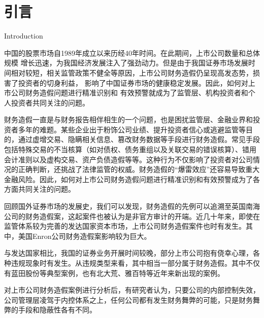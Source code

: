 \chapter{引言}{Introduction}



中国的股票市场自1989年成立以来历经40年时间。在此期间，上市公司数量和总体规模 增长迅速，为我国经济发展注入了强劲动力。但是由于我国证券市场发展时间相对较短，相关监管政策不健全等原因，上市公司财务造假仍呈现高发态势，损害了投资者的切身利益， 影响了中国证券市场的健康稳定发展。因此，如何对上市公司财务造假问题进行精准识别和 有效预警就成为了监管层、机构投资者和个人投资者共同关注的问题。


财务造假一直是与财务报告相伴相生的一个问题，也是困扰监管层、金融业界和投资者多年的难题。某些企业出于粉饰公司业绩、提升投资者信心或逃避监管等目的，通过虚增交易、隐瞒相关信息、篡改财务数据等手段进行财务造假。常见手段包括特殊交易的不当核算（如对债权、债务重组以及关联交易的错误核算）、错用会计准则以及虚构交易、资产负债造假等等。这种行为不仅影响了投资者对公司情况的正确判断，还挑战了法律监管的权威。财务造假的“爆雷效应”还容易导致重大金融风险。因此，如何对上市公司财务造假问题进行精准识别和有效预警成为了各方面共同关注的问题。


回顾国外证券市场的发展史，我们可以发现，财务造假的先例可以追溯至英国南海公司的财务造假案，这起案件也被认为是非官方审计的开端。近几十年来，即使在监管体系较为完善的发达国家资本市场，上市公司财务造假案件也时有发生。其中，美国Enron公司\cite{noauthor_2002:_nodate}财务造假案影响较为巨大。


与发达国家相比，我国的证券业务开展时间较晚，部分上市公司抱有侥幸心理，各种违规现象时有发生。从违规类型来看，其中相当一部分属于财务造假。其中不仅有蓝田股份等典型案例，也有北大荒、雅百特等近年来新出现的案例。


对上市公司财务造假案例进行分析后，有研究者认为，只要公司的内部控制失效，公司管理层凌驾于内控体系之上，任何公司都有发生财务舞弊的可能，只是财务舞弊的手段和隐蔽性各有不同。


